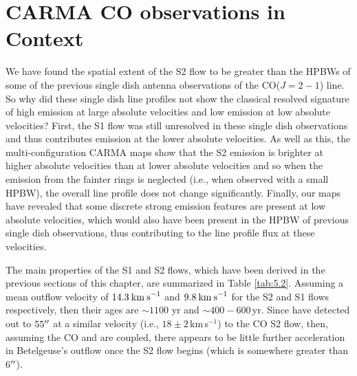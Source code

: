 \section{CARMA CO observations in Context}\label{sec:5.11}
We have found the spatial extent of the S2 flow to be greater than the HPBWs of some of the previous single dish antenna observations of the CO($J=2-1$) line. So why did these single dish line profiles not show the classical resolved signature of high emission at large absolute velocities and low emission at low absolute velocities? First, the S1 flow was still unresolved in these single dish observations and thus contributes emission at the lower absolute velocities. As well as this, the multi-configuration CARMA maps show that the S2 emission is brighter at higher absolute velocities than at lower absolute velocities and so when the emission from the fainter rings is neglected (i.e., when observed with a small HPBW), the overall line profile does not change significantly. Finally, our maps have revealed that some discrete strong emission features are present at low absolute velocities, which would also have been present in the HPBW of previous single dish observations, thus contributing to the line profile flux at these velocities.

The main properties of the S1 and S2 flows, which have been derived in the previous sections of this chapter, are summarized in Table \ref{tab:5.2}. Assuming a mean outflow velocity of $14.3\>{\rm km\>s}^{-1}$ and $9.8\>{\rm km\>s}^{-1}$ for the S2 and S1 flows respectively, then their ages are $\sim 1100$ yr and $\sim 400 - 600$\,yr. Since \cite{plez_2002} have detected  out to $55^{\prime\prime}$ at a similar velocity (i.e., $18 \pm 2$\,km\,s$^{-1}$) to the CO S2 flow, then, assuming the CO and  are coupled, there appears to be little further acceleration in Betelgeuse's outflow once the S2 flow begins (which is somewhere greater than 6$^{\prime\prime}$). 

